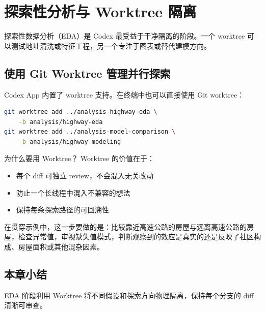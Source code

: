 \section{探索性分析与 Worktree 隔离}

探索性数据分析（EDA）是 Codex 最受益于干净隔离的阶段。一个 worktree 可以测试地址清洗或特征工程，另一个专注于图表或替代建模方向。

\subsection{使用 Git Worktree 管理并行探索}

Codex App 内置了 worktree 支持。在终端中也可以直接使用 Git worktree：

\begin{lstlisting}[caption={创建 worktree 隔离不同探索方向},language=bash]
git worktree add ../analysis-highway-eda \
    -b analysis/highway-eda
git worktree add ../analysis-model-comparison \
    -b analysis/highway-modeling
\end{lstlisting}

\begin{knowledgebox}{为什么要用 Worktree？}
Worktree 的价值在于：
\begin{itemize}[nosep]
    \item 每个 diff 可独立 review，不会混入无关改动
    \item 防止一个长线程中混入不兼容的想法
    \item 保持每条探索路径的可回溯性
\end{itemize}
\end{knowledgebox}

在贯穿示例中，这一步要做的是：比较靠近高速公路的房屋与远离高速公路的房屋，检查异常值，审视缺失值模式，判断观察到的效应是真实的还是反映了社区构成、房屋面积或其他混杂因素。

\subsection{本章小结}
EDA 阶段利用 Worktree 将不同假设和探索方向物理隔离，保持每个分支的 diff 清晰可审查。


